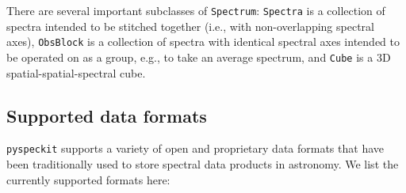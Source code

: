 \documentclass[twocolumn]{aastex62}
\newcommand{\pyspeckit}{\texttt{pyspeckit}\xspace}
\begin{document}
There are several important subclasses of \texttt{Spectrum}: \texttt{Spectra}
is a collection of spectra intended to be stitched together (i.e., with
non-overlapping spectral axes), \texttt{ObsBlock} is a collection of spectra
with identical spectral axes intended to be operated on as a group, e.g., to
take an average spectrum, and \texttt{Cube} is a 3D spatial-spatial-spectral
cube.

\subsection{Supported data formats}

\pyspeckit supports a variety of open and proprietary data formats that have
been traditionally used to store spectral data products in astronomy.
We list the currently supported formats here:
\end{document}

